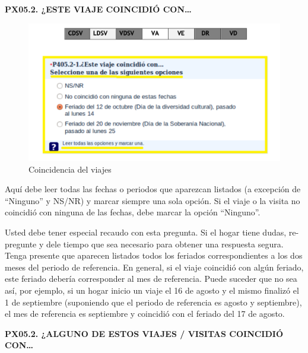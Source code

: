 \documentclass[
  openany]{book}
\begin{document}
\textbf{PX05.2. ¿ESTE VIAJE COINCIDIÓ CON\ldots{}}

\begin{figure}

{\centering \includegraphics[width=1\linewidth]{imagenes/figura6-90} 

}

\caption{Coincidencia del viajes}\label{fig:coincidencia}
\end{figure}

Aquí debe leer todas las fechas o periodos que aparezcan listados (a excepción de ``Ninguno'' y NS/NR) y marcar siempre una sola opción. Si el viaje o la visita no coincidió con ninguna de las fechas, debe marcar la opción ``Ninguno''.

Usted debe tener especial recaudo con esta pregunta. Si el hogar tiene dudas, re-pregunte y dele tiempo que sea necesario para obtener una respuesta segura. Tenga presente que aparecen listados todos los feriados correspondientes a los dos meses del periodo de referencia. En general, si el viaje coincidió con algún feriado, este feriado debería corresponder al mes de referencia. Puede suceder que no sea así, por ejemplo, si un hogar inicio un viaje el 16 de agosto y el mismo finalizó el 1 de septiembre (suponiendo que el periodo de referencia es agosto y septiembre), el mes de referencia es septiembre y coincidió con el feriado del 17 de agosto.

\textbf{PX05.2. ¿ALGUNO DE ESTOS VIAJES / VISITAS COINCIDIÓ CON\ldots{}}
\end{document}
